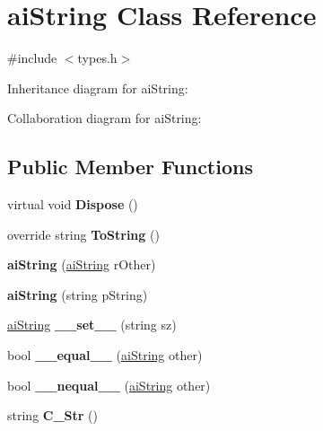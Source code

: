 \hypertarget{structai_string}{\section{ai\+String Class Reference}
\label{structai_string}
}


{\ttfamily \#include $<$types.\+h$>$}



Inheritance diagram for ai\+String\+:


Collaboration diagram for ai\+String\+:
\subsection*{Public Member Functions}
\begin{DoxyCompactItemize}
\item 
\hypertarget{structai_string_a0d177ed49a346c6db830e6211bdb85f4}{virtual void {\bfseries Dispose} ()}\label{structai_string_a0d177ed49a346c6db830e6211bdb85f4}

\item 
\hypertarget{structai_string_a20fbe468a97ecd7c1d39cd28133e5799}{override string {\bfseries To\+String} ()}\label{structai_string_a20fbe468a97ecd7c1d39cd28133e5799}

\item 
\hypertarget{structai_string_a7ffb4448fdf93cf18762706fd03ad40b}{{\bfseries ai\+String} (\hyperlink{structai_string}{ai\+String} r\+Other)}\label{structai_string_a7ffb4448fdf93cf18762706fd03ad40b}

\item 
\hypertarget{structai_string_a85e3c405f4a587c05f1938bb713b0876}{{\bfseries ai\+String} (string p\+String)}\label{structai_string_a85e3c405f4a587c05f1938bb713b0876}

\item 
\hypertarget{structai_string_adce4941822eb7cb877e86efc3d045d34}{\hyperlink{structai_string}{ai\+String} {\bfseries \+\_\+\+\_\+set\+\_\+\+\_\+} (string sz)}\label{structai_string_adce4941822eb7cb877e86efc3d045d34}

\item 
\hypertarget{structai_string_a36add8f6745139209ffde26af87598bd}{bool {\bfseries \+\_\+\+\_\+equal\+\_\+\+\_\+} (\hyperlink{structai_string}{ai\+String} other)}\label{structai_string_a36add8f6745139209ffde26af87598bd}

\item 
\hypertarget{structai_string_a0891deea3564a9794526e383ebdac888}{bool {\bfseries \+\_\+\+\_\+nequal\+\_\+\+\_\+} (\hyperlink{structai_string}{ai\+String} other)}\label{structai_string_a0891deea3564a9794526e383ebdac888}

\item 
\hypertarget{structai_string_aa4a83da00f07554a84fbaaa2bd9a0202}{string {\bfseries C\+\_\+\+Str} ()}\label{structai_string_aa4a83da00f07554a84fbaaa2bd9a0202}

\end{DoxyCompactItemize}
